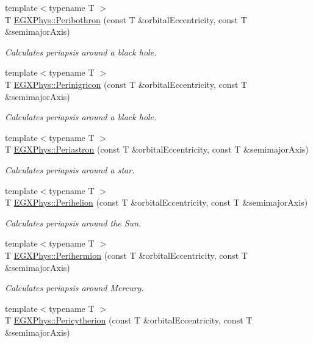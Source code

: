 \begin{DoxyCompactItemize}
{\footnotesize template$<$typename T $>$ }\\T \mbox{\hyperlink{group___periapsis_gada5892309279a3a687c4eb2f88238e4e}{E\+G\+X\+Phys\+::\+Peribothron}} (const T \&orbital\+Eccentricity, const T \&semimajor\+Axis)
\begin{DoxyCompactList}\small\item\em Calculates periapsis around a black hole. \end{DoxyCompactList}\item 
{\footnotesize template$<$typename T $>$ }\\T \mbox{\hyperlink{group___periapsis_ga99d86af90179994e17158b082c502fd4}{E\+G\+X\+Phys\+::\+Perinigricon}} (const T \&orbital\+Eccentricity, const T \&semimajor\+Axis)
\begin{DoxyCompactList}\small\item\em Calculates periapsis around a black hole. \end{DoxyCompactList}\item 
{\footnotesize template$<$typename T $>$ }\\T \mbox{\hyperlink{group___periapsis_ga477de6824cbb5986cdae923141e21648}{E\+G\+X\+Phys\+::\+Periastron}} (const T \&orbital\+Eccentricity, const T \&semimajor\+Axis)
\begin{DoxyCompactList}\small\item\em Calculates periapsis around a star. \end{DoxyCompactList}\item 
{\footnotesize template$<$typename T $>$ }\\T \mbox{\hyperlink{group___periapsis_ga941d285e3a0b48ada9c9f60925ff63c2}{E\+G\+X\+Phys\+::\+Perihelion}} (const T \&orbital\+Eccentricity, const T \&semimajor\+Axis)
\begin{DoxyCompactList}\small\item\em Calculates periapsis around the Sun. \end{DoxyCompactList}\item 
{\footnotesize template$<$typename T $>$ }\\T \mbox{\hyperlink{group___periapsis_ga9562e9cbfd73019ae9cdaa643b843d63}{E\+G\+X\+Phys\+::\+Perihermion}} (const T \&orbital\+Eccentricity, const T \&semimajor\+Axis)
\begin{DoxyCompactList}\small\item\em Calculates periapsis around Mercury. \end{DoxyCompactList}\item 
{\footnotesize template$<$typename T $>$ }\\T \mbox{\hyperlink{group___periapsis_gaa270e364cbbd7d3d6212872df484926f}{E\+G\+X\+Phys\+::\+Pericytherion}} (const T \&orbital\+Eccentricity, const T \&semimajor\+Axis)

\end{DoxyCompactItemize}
